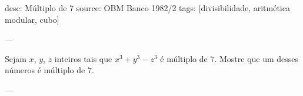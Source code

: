 desc: Múltiplo de 7
source:  OBM Banco 1982/2
tags:  [divisibilidade, aritmética modular, cubo]

---

Sejam $x$, $y$, $z$ inteiros tais que $x^3 + y^3 - z^3$ é múltiplo de $7$. Mostre que um desses números é múltiplo de $7$.

---

